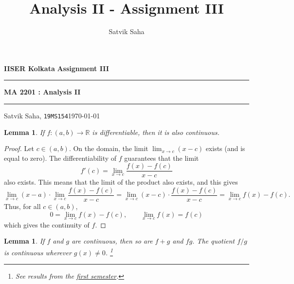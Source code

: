 \documentclass[10pt]{article}
\title{Analysis II - Assignment III}
\author{Satvik Saha}
\date{}
\def\R{\mathbb{R}}
\newtheorem{lemma}[theorem]{Lemma}
\begin{document}
    \par\textbf{IISER Kolkata} \hfill \textbf{Assignment III}
    \vspace{3pt}
    \hrule
    \vspace{3pt}
    \begin{center}
            \LARGE{\textbf{MA 2201 : Analysis II}}
    \end{center}
    \vspace{3pt}
    \hrule
    \vspace{3pt}
    Satvik Saha, \texttt{19MS154}\hfill\today
    \vspace{20pt}
    
    \begin{lemma}
        If $f\colon (a, b) \to \R$ is differentiable, then it is also continuous.
    \end{lemma}
    \begin{proof}
        Let $c \in (a, b)$. On the domain, the limit $\lim_{x \to c} (x - c)$ exists
        (and is equal to zero). The differentiability of $f$ guarantees that the
        limit \[
            f'(c) = \lim_{x \to c} \frac{f(x) - f(c)}{x - c}
        \] also exists. This means that the limit of the product also exists, and
        this gives \[
            \lim_{x \to c}(x - a) \cdot \lim_{x\to c} \frac{f(x) - f(c)}{x - c} =
            \lim_{x \to c} (x - c) \cdot \frac{f(x) - f(c)}{x - c} = \lim_{x \to c}
            f(x) - f(c).
        \] Thus, for all $c \in (a, b)$, \[
            0 = \lim_{x \to c} f(x) - f(c), \qquad \lim_{x \to c} f(x) = f(c)
        \] which gives the continuity of $f$.
    \end{proof}

    \begin{lemma}
        If $f$ and $g$ are continuous, then so are $f + g$ and $fg$. The quotient $f
        /g$ is continuous wherever $g(x) \neq 0$. \footnote{See results from the
        \href{https://sahasatvik.github.io/assignments/MA1101/solutionsheet8.pdf}{first
        semester}.}
    \end{lemma}
\end{document}
